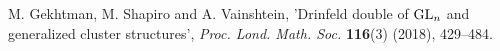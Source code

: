 \begin{thebibliography}{99}



 M. Gekhtman, M. Shapiro and A. Vainshtein, 'Drinfeld double of $\operatorname{GL}_n$ and generalized cluster structures', \emph{Proc. Lond. Math. Soc.} \textbf{116}(3) (2018), 429--484. 








\end{thebibliography}

